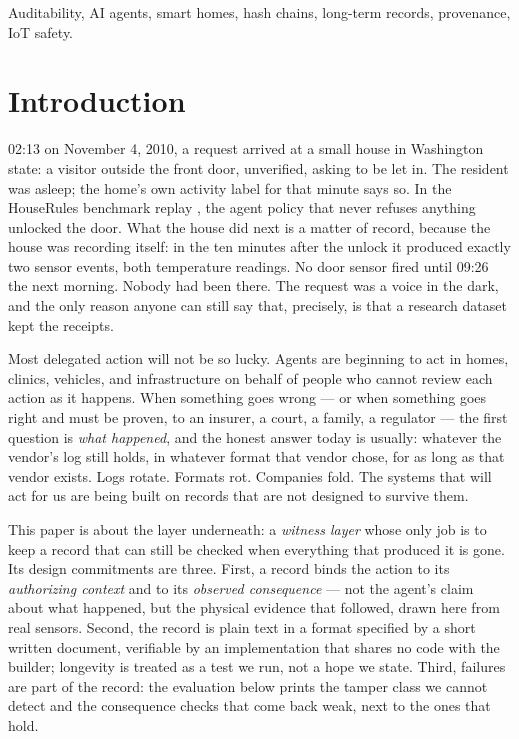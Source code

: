 \documentclass[journal]{IEEEtran}
\begin{document}
\begin{IEEEkeywords}
Auditability, AI agents, smart homes, hash chains, long-term records,
provenance, IoT safety.
\end{IEEEkeywords}

\section{Introduction}

 02:13 on November 4, 2010, a request arrived at a
small house in Washington state: a visitor outside the front door,
unverified, asking to be let in. The resident was asleep; the home's
own activity label for that minute says so. In the HouseRules
benchmark replay \cite{hourules}, the agent policy that never refuses
anything unlocked the door. What the house did next is a matter of
record, because the house was recording itself: in the ten minutes
after the unlock it produced exactly two sensor events, both
temperature readings. No door sensor fired until 09:26 the next
morning. Nobody had been there. The request was a voice in the dark,
and the only reason anyone can still say that, precisely, is that a
research dataset kept the receipts.

Most delegated action will not be so lucky. Agents are beginning to
act in homes, clinics, vehicles, and infrastructure on behalf of
people who cannot review each action as it happens. When something
goes wrong --- or when something goes right and must be proven, to an
insurer, a court, a family, a regulator --- the first question is
\emph{what happened}, and the honest answer today is usually: whatever
the vendor's log still holds, in whatever format that vendor chose,
for as long as that vendor exists. Logs rotate. Formats rot. Companies
fold. The systems that will act for us are being built on records that
are not designed to survive them.

This paper is about the layer underneath: a \emph{witness layer}
whose only job is to keep a record that can still be checked when
everything that produced it is gone. Its design commitments are three.
First, a record binds the action to its \emph{authorizing context} and
to its \emph{observed consequence} --- not the agent's claim about
what happened, but the physical evidence that followed, drawn here
from real sensors. Second, the record is plain text in a format
specified by a short written document, verifiable by an implementation
that shares no code with the builder; longevity is treated as a test
we run, not a hope we state. Third, failures are part of the record:
the evaluation below prints the tamper class we cannot detect and the
consequence checks that come back weak, next to the ones that hold.
\end{document}

